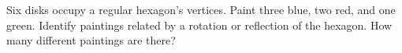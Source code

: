 Six disks occupy a regular hexagon's vertices. Paint three blue, two red, and one green. Identify paintings related by a rotation or reflection of the hexagon. How many different paintings are there?
